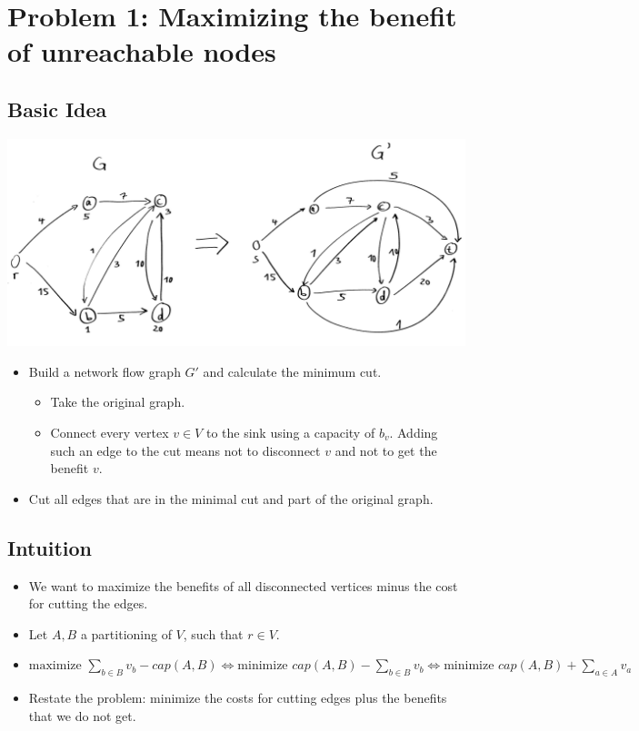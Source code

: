 \documentclass[12pt]{article}
\begin{document}
\section*{Problem 1: Maximizing the benefit of unreachable nodes}
\subsection*{Basic Idea}
\includegraphics[width=\textwidth]{1_1.pdf}
\begin{itemize}
	\item Build a network flow graph $G'$ and calculate the minimum cut.
	\begin{itemize}
		\item Take the original graph.
		\item Connect every vertex $v \in V$ to the sink using a capacity of $b_v$. Adding such an edge to the cut means not to disconnect $v$ and not to get the benefit $v$.
	\end{itemize}
	\item Cut all edges that are in the minimal cut and part of the original graph.
\end{itemize}

\subsection*{Intuition}
\begin{itemize}
	\item We want to maximize the benefits of all disconnected vertices minus the cost for cutting the edges.
	\item Let $A,B$ a partitioning of $V$, such that $r \in V$.
	\item $\mbox{maximize } \sum_{b \in B} v_b - \mathit{cap}(A, B) \Leftrightarrow \mbox{minimize } \mathit{cap}(A, B) - \sum_{b \in B} v_b \Leftrightarrow \mbox{minimize } \mathit{cap}(A, B) + \sum_{a \in A} v_a$
	\item Restate the problem: minimize the costs for cutting edges plus the benefits that we do not get.
\end{itemize}
\end{document}
